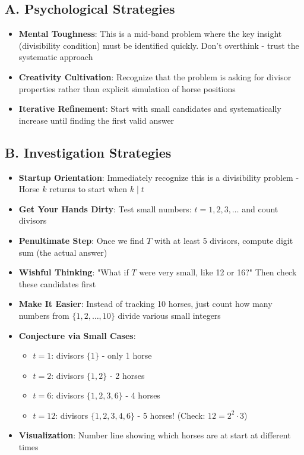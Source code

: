 \documentclass[]{article}
\begin{document}
\begin{strategicbox}
\subsection*{A. Psychological Strategies}
\begin{itemize}[leftmargin=*]
    \item \textbf{Mental Toughness}: This is a mid-band problem where the key insight (divisibility condition) must be identified quickly. Don't overthink - trust the systematic approach
    \item \textbf{Creativity Cultivation}: Recognize that the problem is asking for divisor properties rather than explicit simulation of horse positions
    \item \textbf{Iterative Refinement}: Start with small candidates and systematically increase until finding the first valid answer
\end{itemize}

\subsection*{B. Investigation Strategies}
\begin{itemize}[leftmargin=*]
    \item \textbf{Startup Orientation}: Immediately recognize this is a divisibility problem - Horse $k$ returns to start when $k \mid t$
    \item \textbf{Get Your Hands Dirty}: Test small numbers: $t = 1, 2, 3, \ldots$ and count divisors
    \item \textbf{Penultimate Step}: Once we find $T$ with at least 5 divisors, compute digit sum (the actual answer)
    \item \textbf{Wishful Thinking}: "What if $T$ were very small, like 12 or 16?" Then check these candidates first
    \item \textbf{Make It Easier}: Instead of tracking 10 horses, just count how many numbers from $\{1,2,\ldots,10\}$ divide various small integers
    \item \textbf{Conjecture via Small Cases}: 
    \begin{itemize}
        \item $t=1$: divisors $\{1\}$ - only 1 horse
        \item $t=2$: divisors $\{1,2\}$ - 2 horses
        \item $t=6$: divisors $\{1,2,3,6\}$ - 4 horses
        \item $t=12$: divisors $\{1,2,3,4,6\}$ - 5 horses! (Check: $12 = 2^2 \cdot 3$)
    \end{itemize}
    \item \textbf{Visualization}: Number line showing which horses are at start at different times
\end{itemize}


\end{strategicbox}
\end{document}
